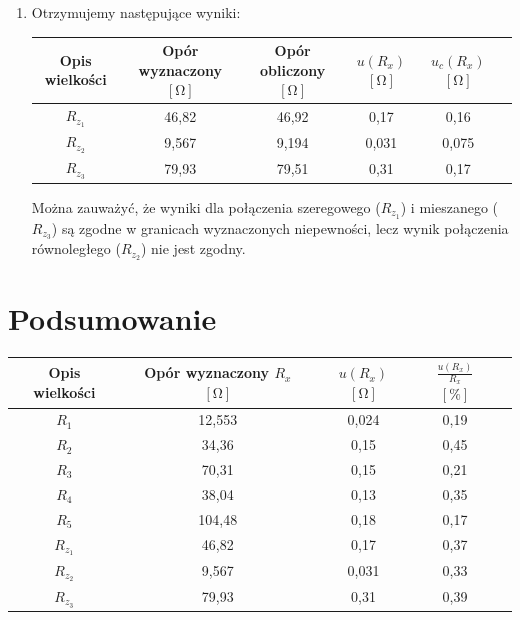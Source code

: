 \documentclass [a4paper,11pt]{article}
\begin{document}
\begin{enumerate}[label=\alph*)]
		\item Otrzymujemy następujące wyniki:
		\begin{center}
			\begin{tabular}{|c|c|c|c|c|c|}
				\hline Opis wielkości & Opór wyznaczony $[\mathrm{\Omega}]$ & Opór obliczony $[\mathrm{\Omega}]$ & $u(R_x)$ $[\mathrm{\Omega}]$ & $u_c(R_x)$ $[\mathrm{\Omega}]$ \\
				\hline $R_{z_1}$ & 46,82 & 46,92 & 0,17 & 0,16  \\
				\hline $R_{z_2}$ & 9,567 & 9,194 & 0,031 & 0,075  \\  
				\hline $R_{z_3}$ & 79,93 & 79,51  & 0,31 &  0,17 \\ 
				\hline 
			\end{tabular} 
		\end{center}
		Można zauważyć, że wyniki dla połączenia szeregowego ($R_{z_1}$) i mieszanego ($R_{z_3}$) są zgodne w granicach wyznaczonych niepewności, lecz wynik połączenia równoległego ($R_{z_2}$) nie jest zgodny.
	
	\end{enumerate}
	
	\section{Podsumowanie}
	\begin{center}
		\begin{tabular}{|c|c|c|c|c|}
			\hline Opis wielkości & Opór wyznaczony $R_x$ $[\mathrm{\Omega}]$ & $u(R_x)$ $[\mathrm{\Omega}]$ &  $ \frac{u(R_x)}{R_x} $ $[\%]$ \\
			\hline $R_1$ & 12,553 & 0,024 & 0,19  \\
			\hline $R_2$ & 34,36 & 0,15 & 0,45  \\
			\hline $R_3$ & 70,31 & 0,15 & 0,21  \\
			\hline $R_4$ & 38,04 & 0,13 & 0,35  \\
			\hline $R_5$ & 104,48 & 0,18 & 0,17  \\
			\hline $R_{z_1}$ & 46,82 & 0,17 & 0,37  \\
			\hline $R_{z_2}$ & 9,567 & 0,031 & 0,33  \\  
			\hline $R_{z_3}$ & 79,93 & 0,31 & 0,39  \\ 
			\hline 
		\end{tabular} 
	\end{center}
\vspace{1em}
\end{document}
